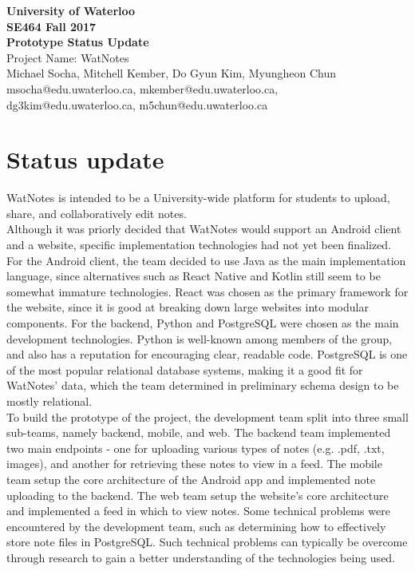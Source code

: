 \documentclass[12pt]{article}
\begin{document}
  \begin{center}
  \vspace*{\fill}
  {\Large\bf University of Waterloo}\\
  \vspace{3mm}
  {\large\bf SE464 Fall 2017}\\
  \vspace{3mm}
  {\Large\bf Prototype Status Update}\\
  \vspace{5mm}
  {\Large Project Name: WatNotes}\\
  \vspace{5mm}
  Michael Socha, Mitchell Kember, Do Gyun Kim, Myungheon Chun\\
  \vspace{3mm}
  msocha@edu.uwaterloo.ca, mkember@edu.uwaterloo.ca, dg3kim@edu.uwaterloo.ca, m5chun@edu.uwaterloo.ca\\
  \vspace*{\fill}
  \end{center}

  \newpage

\section{Status update}
  WatNotes is intended to be a University-wide platform for students to upload, share, and collaboratively edit notes. \\

  Although it was priorly decided that WatNotes would support an Android client and a website, specific implementation technologies had not yet been finalized. For the Android client, the team decided to use Java as the main implementation language, since alternatives such as React Native and Kotlin still seem to be somewhat immature technologies. React was chosen as the primary framework for the website, since it is good at breaking down large websites into modular components. For the backend, Python and PostgreSQL were chosen as the main development technologies. Python is well-known among members of the group, and also has a reputation for encouraging clear, readable code. PostgreSQL is one of the most popular relational database systems, making it a good fit for WatNotes' data, which the team determined in preliminary schema design to be mostly relational. \\

  To build the prototype of the project, the development team split into three small sub-teams, namely backend, mobile, and web. The backend team implemented two main endpoints - one for uploading various types of notes (e.g. .pdf, .txt, images), and another for retrieving these notes to view in a feed. The mobile team setup the core architecture of the Android app and implemented note uploading to the backend. The web team setup the website's core architecture and implemented a feed in which to view notes. Some technical problems were encountered by the development team, such as determining how to effectively store note files in PostgreSQL. Such technical problems can typically be overcome through research to gain a better understanding of the technologies being used. \\
\end{document}
